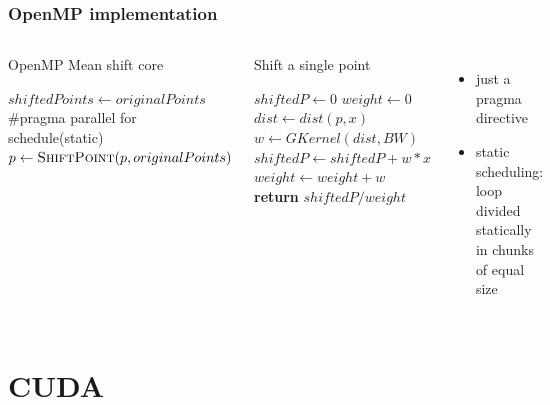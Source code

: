 \documentclass[xcolor=table]{beamer}
\begin{document}
\begin{frame}
\frametitle{OpenMP implementation}
\begin{columns}[c]

\begin{algorithm}[H]
\tiny
\caption{OpenMP Mean shift core}
\label{OpenMPAlgorithm}
\begin{algorithmic}
	\State$shiftedPoints \gets originalPoints$
    			\State \colorbox{lime!30}{\#pragma parallel for schedule(static)}
               \State $p\gets \Call{ShiftPoint}{p, originalPoints}$
            \EndFor
    \EndWhile
\EndFunction
\end{algorithmic}
\end{algorithm}

\begin{algorithm}[H]
\tiny
\caption{Shift a single point}
\label{ShiftPointAlgSeq}
\begin{algorithmic}
	\State $shiftedP\gets0$
	\State $weight\gets0$
    		\State$dist \gets dist(p, x)$
    		\State $w \gets GKernel(dist, BW)$
    		\State $shiftedP \gets shiftedP + w*x$
    		\State $weight \gets weight + w$
    \EndFor
    \State \textbf{return} $shiftedP/weight$
\EndFunction

\end{algorithmic}
\end{algorithm}

\begin{itemize}
\item just a pragma directive
\vspace{0.75cm}
\item static scheduling: loop divided statically in chunks of equal size
\end{itemize}

\end{columns}
\end{frame}


\section{CUDA}
\end{document}
